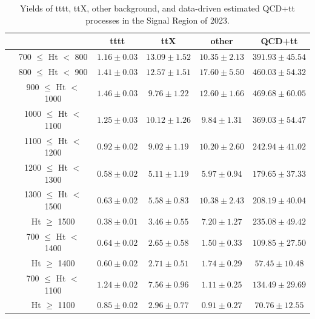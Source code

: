 \documentclass[twoside]{article}
\begin{document}
\begin{table}[h!]
\centering
\begin{adjustbox}{width=\textwidth}
\begin{tabular}{>{\raggedright\arraybackslash}p{3cm}ccccc}
\toprule
 & & \textbf{tttt} & \textbf{ttX} & \textbf{other} & \textbf{QCD+tt} \\
\midrule
\multirow{8}{*}{$N_{RT}=1, N_{BT}=0$} 
 & 700 $\leq$ Ht $<$ 800 & $1.16 \pm 0.03$ & $13.09 \pm 1.52$ & $10.35 \pm 2.13$ & $391.93 \pm 45.54$ \\
 & 800 $\leq$ Ht $<$ 900 & $1.41 \pm 0.03$ & $12.57 \pm 1.51$ & $17.60 \pm 5.50$ & $460.03 \pm 54.32$ \\
 & 900 $\leq$ Ht $<$ 1000 & $1.46 \pm 0.03$ & $9.76 \pm 1.22$ & $12.60 \pm 1.66$ & $469.68 \pm 60.05$ \\
 & 1000 $\leq$ Ht $<$ 1100 & $1.25 \pm 0.03$ & $10.12 \pm 1.26$ & $9.84 \pm 1.31$ & $369.03 \pm 54.47$ \\
 & 1100 $\leq$ Ht $<$ 1200 & $0.92 \pm 0.02$ & $9.02 \pm 1.19$ & $10.20 \pm 2.60$ & $242.94 \pm 41.02$ \\
 & 1200 $\leq$ Ht $<$ 1300 & $0.58 \pm 0.02$ & $5.11 \pm 1.19$ & $5.97 \pm 0.94$ & $179.65 \pm 37.33$ \\
 & 1300 $\leq$ Ht $<$ 1500 & $0.63 \pm 0.02$ & $5.58 \pm 0.83$ & $10.38 \pm 2.43$ & $208.19 \pm 40.04$ \\
 & Ht $\geq$ 1500 & $0.38 \pm 0.01$ & $3.46 \pm 0.55$ & $7.20 \pm 1.27$ & $235.08 \pm 49.42$ \\
\midrule
\multirow{2}{*}{$N_{RT}=1, N_{BT}\geq1$} 
 & 700 $\leq$ Ht $<$ 1400 & $0.64 \pm 0.02$ & $2.65 \pm 0.58$ & $1.50 \pm 0.33$ & $109.85 \pm 27.50$ \\
 & Ht $\geq$ 1400 & $0.60 \pm 0.02$ & $2.71 \pm 0.51$ & $1.74 \pm 0.29$ & $57.45 \pm 10.48$ \\
\midrule
\multirow{2}{*}{$N_{RT}\geq2$} 
 & 700 $\leq$ Ht $<$ 1100 & $1.24 \pm 0.02$ & $7.56 \pm 0.96$ & $1.11 \pm 0.25$ & $134.49 \pm 29.69$ \\
 & Ht $\geq$ 1100 & $0.85 \pm 0.02$ & $2.96 \pm 0.77$ & $0.91 \pm 0.27$ & $70.76 \pm 12.55$ \\
\bottomrule
\end{tabular}
\end{adjustbox}
\caption{Yields of tttt, ttX, other background, and data-driven estimated QCD+tt processes in the Signal Region of 2023.}
\label{fig:yield2023}
\end{table}
\end{document}
